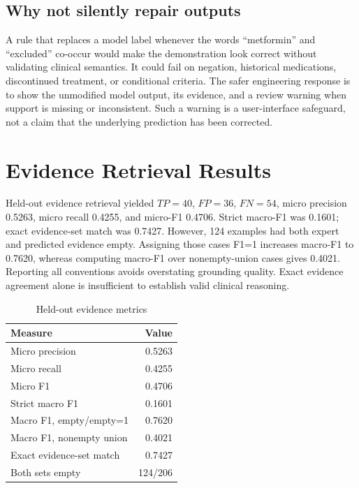 \documentclass[conference]{IEEEtran}
\begin{document}
\subsection{Why not silently repair outputs}
A rule that replaces a model label whenever the words ``metformin'' and ``excluded'' co-occur would make the demonstration look correct without validating clinical semantics. It could fail on negation, historical medications, discontinued treatment, or conditional criteria. The safer engineering response is to show the unmodified model output, its evidence, and a review warning when support is missing or inconsistent. Such a warning is a user-interface safeguard, not a claim that the underlying prediction has been corrected.

\section{Evidence Retrieval Results}
Held-out evidence retrieval yielded $TP=40$, $FP=36$, $FN=54$, micro precision 0.5263, micro recall 0.4255, and micro-F1 0.4706. Strict macro-F1 was 0.1601; exact evidence-set match was 0.7427. However, 124 examples had both expert and predicted evidence empty. Assigning those cases F1=1 increases macro-F1 to 0.7620, whereas computing macro-F1 over nonempty-union cases gives 0.4021. Reporting all conventions avoids overstating grounding quality. Exact evidence agreement alone is insufficient to establish valid clinical reasoning.
\begin{table}[!t]\centering\caption{Held-out evidence metrics}\begin{tabular}{lr}\toprule Measure&Value\\\midrule Micro precision&0.5263\\Micro recall&0.4255\\Micro F1&0.4706\\Strict macro F1&0.1601\\Macro F1, empty/empty=1&0.7620\\Macro F1, nonempty union&0.4021\\Exact evidence-set match&0.7427\\Both sets empty&124/206\\\bottomrule\end{tabular}\end{table}
\end{document}
